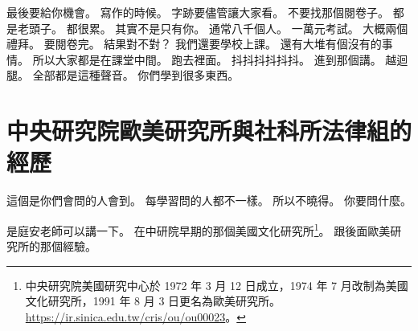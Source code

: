 \hypertarget{c01:cue:3754}{}最後要給你機會。
\hypertarget{c01:cue:3755}{}寫作的時候。
\hypertarget{c01:cue:3756}{}字跡要儘管讓大家看。
\hypertarget{c01:cue:3757}{}不要找那個閱卷子。
\hypertarget{c01:cue:3758}{}都是老頭子。
\hypertarget{c01:cue:3759}{}都很累。
\hypertarget{c01:cue:3760}{}其實不是只有你。
\hypertarget{c01:cue:3761}{}通常八千個人。
\hypertarget{c01:cue:3762}{}一萬元考試。
\hypertarget{c01:cue:3763}{}大概兩個禮拜。
\hypertarget{c01:cue:3764}{}要閱卷完。
\hypertarget{c01:cue:3765}{}結果對不對？
\hypertarget{c01:cue:3766}{}我們還要學校上課。
\hypertarget{c01:cue:3767}{}還有大堆有個沒有的事情。
\hypertarget{c01:cue:3768}{}所以大家都是在課堂中間。
\hypertarget{c01:cue:3769}{}跑去裡面。
\hypertarget{c01:cue:3770}{}抖抖抖抖抖抖。
\hypertarget{c01:cue:3771}{}進到那個講。
\hypertarget{c01:cue:3772}{}越迴腿。
\hypertarget{c01:cue:3773}{}全部都是這種聲音。
\hypertarget{c01:cue:3774}{}你們學到很多東西。

\section{中央研究院歐美研究所與社科所法律組的經歷}

\hypertarget{c01:cue:3775}{}這個是你們會問的人會到。
\hypertarget{c01:cue:3776}{}每學習問的人都不一樣。
\hypertarget{c01:cue:3777}{}所以不曉得。
\hypertarget{c01:cue:3778}{}你要問什麼。

\hypertarget{c01:cue:3779}{}是庭安老師可以講一下。
\hypertarget{c01:cue:3780}{}在中研院早期的那個美國文化研究所\footnote{中央研究院美國研究中心於 1972 年 3 月 12 日成立，1974 年 7 月改制為美國文化研究所，1991 年 8 月 3 日更名為歐美研究所。\url{https://ir.sinica.edu.tw/cris/ou/ou00023}。}。
\hypertarget{c01:cue:3781}{}跟後面歐美研究所的那個經驗。

